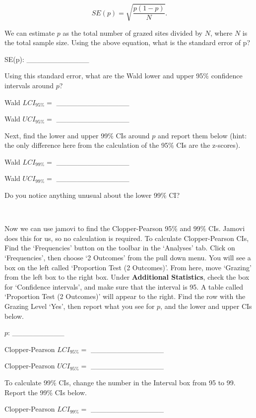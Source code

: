 \documentclass[
  openany]{krantz}
\begin{document}
\[SE(p) = \sqrt{\frac{p\left(1 - p\right)}{N}}.\]

We can estimate \(p\) as the total number of grazed sites divided by \(N\), where \(N\) is the total sample size.
Using the above equation, what is the standard error of p?

SE(p): \_\_\_\_\_\_\_\_\_\_\_\_

Using this standard error, what are the Wald lower and upper 95\% confidence intervals around \(p\)?

Wald \(LCI_{95\%} =\) \_\_\_\_\_\_\_\_\_\_\_\_\_\_

Wald \(UCI_{95\%} =\) \_\_\_\_\_\_\_\_\_\_\_\_\_\_

Next, find the lower and upper 99\% CIs around \(p\) and report them below (hint: the only difference here from the calculation of the 95\% CIs are the z-scores).

Wald \(LCI_{99\%} =\) \_\_\_\_\_\_\_\_\_\_\_\_\_\_

Wald \(UCI_{99\%} =\) \_\_\_\_\_\_\_\_\_\_\_\_\_\_

Do you notice anything unusual about the lower 99\% CI?

\begin{verbatim}


\end{verbatim}

Now we can use jamovi to find the Clopper-Pearson 95\% and 99\% CIs.
Jamovi does this for us, so no calculation is required.
To calculate Clopper-Pearson CIs, Find the `Frequencies' button on the toolbar in the `Analyses' tab.
Click on `Frequencies', then choose `2 Outcomes' from the pull down menu.
You will see a box on the left called `Proportion Test (2 Outcomes)'.
From here, move `Grazing' from the left box to the right box.
Under \textbf{Additional Statistics}, check the box for `Confidence intervals', and make sure that the interval is 95.
A table called `Proportion Test (2 Outcomes)' will appear to the right.
Find the row with the Grazing Level `Yes', then report what you see for \(p\), and the lower and upper CIs below.

\(p\): \_\_\_\_\_\_\_\_\_\_

Clopper-Pearson \(LCI_{95\%} =\) \_\_\_\_\_\_\_\_\_\_\_\_\_\_

Clopper-Pearson \(UCI_{95\%} =\) \_\_\_\_\_\_\_\_\_\_\_\_\_\_

To calculate 99\% CIs, change the number in the Interval box from 95 to 99.
Report the 99\% CIs below.

Clopper-Pearson \(LCI_{99\%} =\) \_\_\_\_\_\_\_\_\_\_\_\_\_\_
\end{document}
